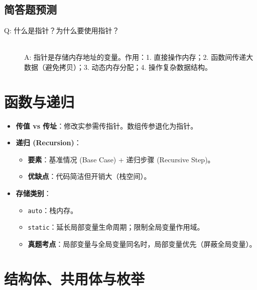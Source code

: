 \documentclass[a4paper,12pt]{article}
\begin{document}
\subsection{简答题预测}
\begin{description}
    \item[Q: 什么是指针？为什么要使用指针？] \hfill \\
    A: 指针是存储内存地址的变量。作用：1. 直接操作内存；2. 函数间传递大数据（避免拷贝）；3. 动态内存分配；4. 操作复杂数据结构。
\end{description}

\section{函数与递归}
\label{sec:functions}

\begin{itemize}
    \item \textbf{传值 vs 传址}：修改实参需传指针。数组传参退化为指针。
    \item \textbf{递归 (Recursion)}：
    \begin{itemize}
        \item \textbf{要素}：基准情况 (Base Case) + 递归步骤 (Recursive Step)。
        \item \textbf{优缺点}：代码简洁但开销大（栈空间）。
    \end{itemize}
    \item \textbf{存储类别}：
    \begin{itemize}
        \item \texttt{auto}：栈内存。
        \item \texttt{static}：延长局部变量生命周期；限制全局变量作用域。
        \item \textbf{真题考点}：局部变量与全局变量同名时，局部变量优先（屏蔽全局变量）。
    \end{itemize}
\end{itemize}

\section{结构体、共用体与枚举}
\end{document}
